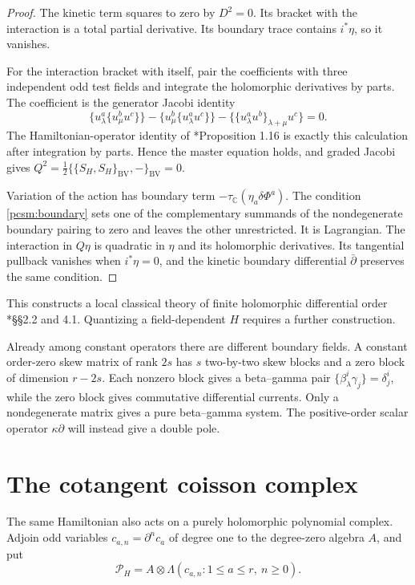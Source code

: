 \begin{proof}
The kinetic term squares to zero by \(D^2=0\).
Its bracket with the interaction is a total partial derivative.
Its boundary trace contains \(i^*\eta\), so it vanishes.

For the interaction bracket with itself, pair the coefficients with
three independent odd test fields and integrate the holomorphic
derivatives by parts. The coefficient is the generator Jacobi identity
\[
 \{u^a_\lambda\{u^b_\mu u^c\}\}
 -\{u^b_\mu\{u^a_\lambda u^c\}\}
 -\{\{u^a_\lambda u^b\}_{\lambda+\mu}u^c\}=0.
\]
The Hamiltonian-operator identity of
\cite{pcsm:BDK}*{Proposition 1.16} is exactly this calculation after
integration by parts. Hence the master equation holds, and graded
Jacobi gives
\(Q^2=\tfrac12\{\{S_H,S_H\}_{\mathrm{BV}},-\}_{\mathrm{BV}}=0\).

Variation of the action has boundary term
\(-\tau_{\mathbb C}(\eta_a\delta\Phi^a)\).
The condition \eqref{pcsm:boundary} sets one of the complementary
summands of the nondegenerate boundary pairing to zero and leaves
the other unrestricted. It is Lagrangian.
The interaction in \(Q\eta\) is quadratic in \(\eta\) and its
holomorphic derivatives. Its tangential pullback vanishes when
\(i^*\eta=0\), and the kinetic boundary differential
\(\bar\partial\) preserves the same condition.
\end{proof}

This constructs a local classical theory of finite holomorphic
differential order \cite{pcsm:KZ}*{\S\S2.2 and 4.1}.
Quantizing a field-dependent \(H\) requires a further construction.

Already among constant operators there are different boundary fields.
A constant order-zero skew matrix of rank \(2s\) has \(s\)
two-by-two skew blocks and a zero block of dimension \(r-2s\).
Each nonzero block gives a beta--gamma pair
\(\{\beta^i_\lambda\gamma_j\}=\delta^i_j\), while the zero block
gives commutative differential currents. Only a nondegenerate matrix
gives a pure beta--gamma system. The positive-order scalar operator
\(\kappa\partial\) will instead give a double pole.

\section{The cotangent coisson complex}
\label{pcsm:cotangent}

The same Hamiltonian also acts on a purely holomorphic polynomial
complex. Adjoin odd variables \(c_{a,n}=\partial^nc_a\) of degree
one to the degree-zero algebra \(A\), and put
\[
 \mathcal P_H=A\otimes\Lambda(c_{a,n}:1\leq a\leq r,\ n\geq0).
\]

